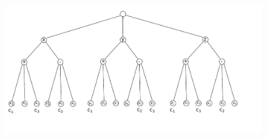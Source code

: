 \begin{figure}[htbp]
\includegraphics[width = \columnwidth]{figs/formula-example.pdf}
\end{figure}

